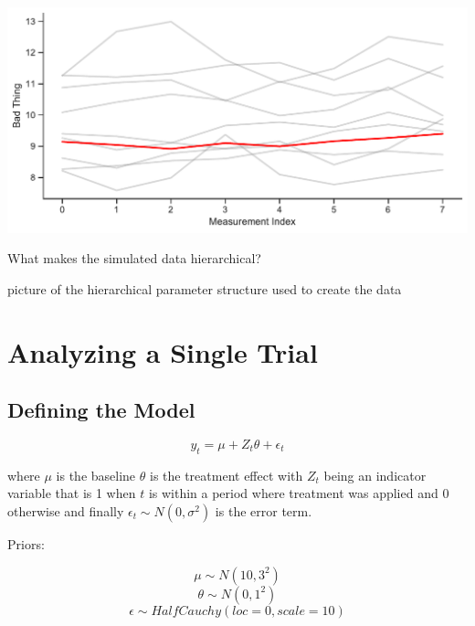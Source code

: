 \documentclass[12pt,a4paper,leqno]{report}
\theoremstyle{plain}
\theoremstyle{definition}
\theoremstyle{remark}
\begin{document}
\bigskip
{
    \centering
    \includegraphics[width=\textwidth,height=\textheight,keepaspectratio]{measurements_timeline.pdf}
    \par
}
\bigskip



What makes the simulated data hierarchical?

picture of the hierarchical parameter structure used to create the data

\section{Analyzing a Single Trial}\label{1trial}

\subsection{Defining the Model}\label{1model}

\begin{def}\label{simulationmodel}
    \begin{equation}\label{}
        y_t = \mu + Z_t\theta + \epsilon_t
    \end{equation}
\end{def}where \(\mu\) is the baseline
\(\theta\) is the treatment effect with \(Z_t\) being an indicator variable that is 1 when
\(t\) is within a period where treatment was applied and 0 otherwise and finally
\(\epsilon_t \sim N(0,\sigma^2) \) is the error term.

Priors:

\begin{def}\label{simulationmodel}
    \begin{equation}\label{}
        \mu \sim N(10, 3^2)
    \end{equation}
    \begin{equation}\label{}
        \theta \sim N(0, 1^2)
    \end{equation}
    \begin{equation}\label{}
        \epsilon \sim HalfCauchy(loc=0, scale=10)
    \end{equation}
\end{def}
\end{document}
